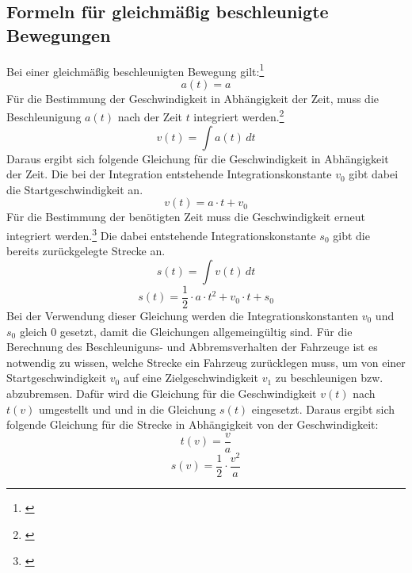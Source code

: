 \subsection{Formeln für gleichmäßig beschleunigte Bewegungen} \label{formulaBeschleunigung}
\noindent Bei einer gleichmäßig beschleunigten Bewegung gilt:\footnote{\citet[S. 22]{richard2011technische}}
\begin{equation}
a(t) = a
\end{equation}
Für die Bestimmung der Geschwindigkeit in Abhängigkeit der Zeit, muss die Beschleunigung $a(t)$ nach der Zeit $t$ integriert werden.\footnote{\citet[S. 20]{richard2011technische}}
\begin{equation}
v(t) = \int a(t) \,dt
\end{equation}
Daraus ergibt sich folgende Gleichung für die Geschwindigkeit in Abhängigkeit der Zeit. Die bei der Integration entstehende Integrationskonstante $v_{0}$ gibt dabei die Startgeschwindigkeit an.
\begin{equation}
v(t) = a \cdot t + v_{0}
\end{equation} %
Für die Bestimmung der benötigten Zeit muss die Geschwindigkeit erneut integriert werden.\footnote{\citet[S. 20]{richard2011technische}} Die dabei entstehende Integrationskonstante $s_{0}$ gibt die bereits zurückgelegte Strecke an.
\begin{equation}
s(t) = \int v(t) \,dt
\end{equation}
\begin{equation}
s(t) =\frac{1}{2} \cdot a \cdot t^{2} + v_{0}  \cdot t + s_{0}
\end{equation}
Bei der Verwendung dieser Gleichung werden die Integrationskonstanten $v_{0}$ und $s_{0}$ gleich $0$ gesetzt, damit die Gleichungen allgemeingültig sind. Für die Berechnung des Beschleuniguns- und Abbremsverhalten der Fahrzeuge ist es notwendig zu wissen, welche Strecke ein Fahrzeug zurücklegen muss, um von einer Startgeschwindigkeit $v_{0}$ auf eine Zielgeschwindigkeit $v_{1}$ zu beschleunigen bzw. abzubremsen. Dafür wird die Gleichung für die Geschwindigkeit $v(t)$ nach $t(v)$ umgestellt und und in die Gleichung $s(t)$ eingesetzt. Daraus ergibt sich folgende Gleichung für die Strecke in Abhängigkeit von der Geschwindigkeit:
\begin{equation}
t(v) = \frac{v}{a}
\end{equation}
\begin{equation}
s(v) =\frac{1}{2} \cdot \frac{v^{2}}{a}
\end{equation}
